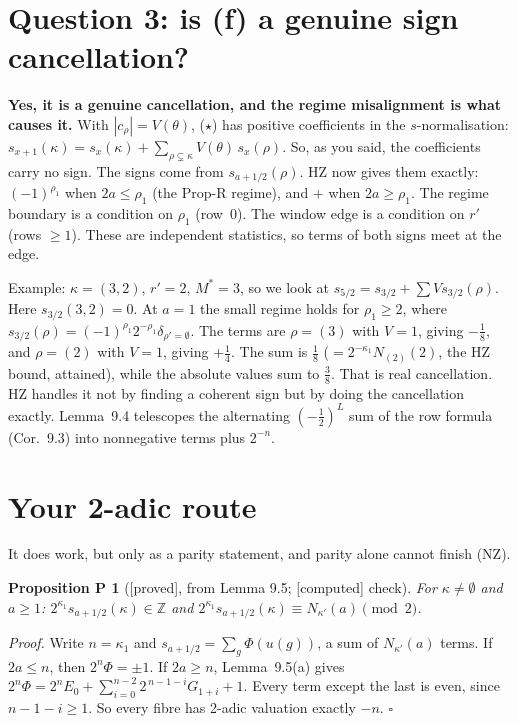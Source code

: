 \documentclass[10pt]{amsart}
\newcommand{\grade}[1]{\textsf{[#1]}}
\newtheorem*{propP}{Proposition P}
\theoremstyle{remark}
\begin{document}
\section{Question 3: is (f) a genuine sign cancellation?}
\textbf{Yes, it is a genuine cancellation, and the regime misalignment is what causes it.} With $|c_\rho|=V(\theta)$,
(\(\star\)) has positive coefficients in the $s$-normalisation:
$s_{x+1}(\kappa)=s_x(\kappa)+\sum_{\rho\subsetneq\kappa}V(\theta)\,s_x(\rho)$. So, as you said, the coefficients carry no
sign. The signs come from $s_{a+1/2}(\rho)$. HZ now gives them exactly: $(-1)^{\rho_1}$ when $2a\le\rho_1$ (the Prop-R
regime), and $+$ when $2a\ge\rho_1$. The regime boundary is a condition on $\rho_1$ (row~0). The window edge is a
condition on $r'$ (rows $\ge1$). These are independent statistics, so terms of both signs meet at the edge.

Example: $\kappa=(3,2)$, $r'=2$, $M^*=3$, so we look at $s_{5/2}=s_{3/2}+\sum V s_{3/2}(\rho)$. Here $s_{3/2}(3,2)=0$. At $a=1$ the
small regime holds for $\rho_1\ge2$, where $s_{3/2}(\rho)=(-1)^{\rho_1}2^{-\rho_1}\delta_{\rho'=\emptyset}$. The terms are
$\rho=(3)$ with $V=1$, giving $-\tfrac18$, and $\rho=(2)$ with $V=1$, giving $+\tfrac14$. The sum is $\tfrac18$
($=2^{-\kappa_1}N_{(2)}(2)$, the HZ bound, attained), while the absolute values sum to $\tfrac38$. That is real
cancellation. HZ handles it not by finding a coherent sign but by doing the cancellation exactly. Lemma~9.4 telescopes
the alternating $(-\tfrac12)^L$ sum of the row formula (Cor.~9.3) into nonnegative terms plus $2^{-n}$.

\section{Your 2-adic route}
It does work, but only as a parity statement, and parity alone cannot finish (NZ).
\begin{propP}[\grade{proved}, from Lemma 9.5; \grade{computed} check]
For $\kappa\ne\emptyset$ and $a\ge1$: $2^{\kappa_1}s_{a+1/2}(\kappa)\in\mathbb Z$ and
$2^{\kappa_1}s_{a+1/2}(\kappa)\equiv N_{\kappa'}(a)\pmod 2$.
\end{propP}
\emph{Proof.} Write $n=\kappa_1$ and $s_{a+1/2}=\sum_g\Phi(u(g))$, a sum of $N_{\kappa'}(a)$ terms. If $2a\le n$, then
$2^n\Phi=\pm1$. If $2a\ge n$, Lemma~9.5(a) gives
$2^n\Phi=2^nE_0+\sum_{i=0}^{n-2}2^{\,n-1-i}G_{1+i}+1$. Every term except the last is even, since $n-1-i\ge1$. So every
fibre has 2-adic valuation exactly $-n$. $\square$
\end{document}
